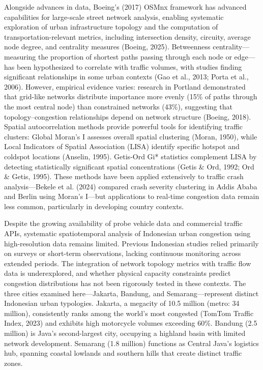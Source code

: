 \documentclass[12pt,a4paper]{article}
\begin{document}
Alongside advances in data, Boeing's (2017) OSMnx framework has advanced capabilities for large-scale street network analysis, enabling systematic exploration of urban infrastructure topology and the computation of transportation-relevant metrics, including intersection density, circuity, average node degree, and centrality measures (Boeing, 2025). Betweenness centrality---measuring the proportion of shortest paths passing through each node or edge---has been hypothesized to correlate with traffic volumes, with studies finding significant relationships in some urban contexts (Gao et al., 2013; Porta et al., 2006). However, empirical evidence varies: research in Portland demonstrated that grid-like networks distribute importance more evenly (15\% of paths through the most central node) than constrained networks (43\%), suggesting that topology--congestion relationships depend on network structure (Boeing, 2018). Spatial autocorrelation methods provide powerful tools for identifying traffic clusters: Global Moran's I assesses overall spatial clustering (Moran, 1950), while Local Indicators of Spatial Association (LISA) identify specific hotspot and coldspot locations (Anselin, 1995). Getis-Ord Gi* statistics complement LISA by detecting statistically significant spatial concentrations (Getis \& Ord, 1992; Ord \& Getis, 1995). These methods have been applied extensively to traffic crash analysis---Bekele et al. (2024) compared crash severity clustering in Addis Ababa and Berlin using Moran's I---but applications to real-time congestion data remain less common, particularly in developing country contexts.

Despite the growing availability of probe vehicle data and commercial traffic APIs, systematic spatiotemporal analysis of Indonesian urban congestion using high-resolution data remains limited. Previous Indonesian studies relied primarily on surveys or short-term observations, lacking continuous monitoring across extended periods. The integration of network topology metrics with traffic flow data is underexplored, and whether physical capacity constraints predict congestion distributions has not been rigorously tested in these contexts. The three cities examined here---Jakarta, Bandung, and Semarang---represent distinct Indonesian urban typologies. Jakarta, a megacity of 10.5 million (metro: 34 million), consistently ranks among the world's most congested (TomTom Traffic Index, 2023) and exhibits high motorcycle volumes exceeding 60\%. Bandung (2.5 million) is Java's second-largest city, occupying a highland basin with limited network development. Semarang (1.8 million) functions as Central Java's logistics hub, spanning coastal lowlands and southern hills that create distinct traffic zones.
\end{document}

